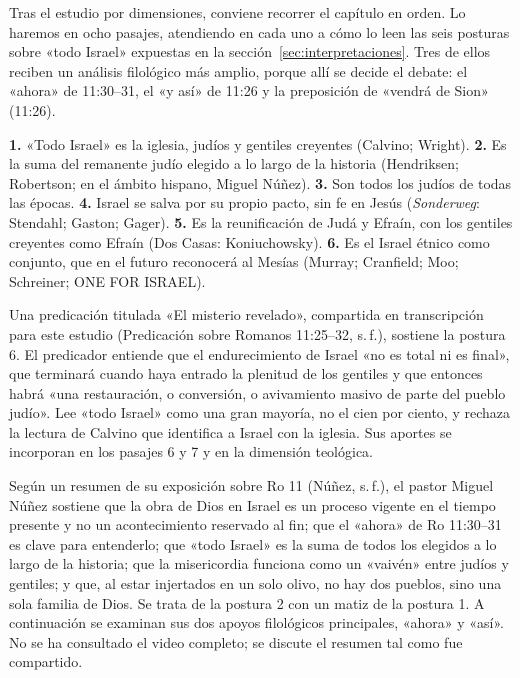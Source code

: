 Tras el estudio por dimensiones, conviene recorrer el capítulo en orden. Lo haremos en ocho pasajes, atendiendo en cada uno a cómo lo leen las seis posturas sobre «todo Israel» expuestas en la sección~\ref{sec:interpretaciones}. Tres de ellos reciben un análisis filológico más amplio, porque allí se decide el debate: el «ahora» de 11:30--31, el «y así» de 11:26 y la preposición de «vendrá de Sion» (11:26).

\begin{nota}
\textbf{1.} «Todo Israel» es la iglesia, judíos y gentiles creyentes (Calvino; Wright). \textbf{2.} Es la suma del remanente judío elegido a lo largo de la historia (Hendriksen; Robertson; en el ámbito hispano, Miguel Núñez). \textbf{3.} Son todos los judíos de todas las épocas. \textbf{4.} Israel se salva por su propio pacto, sin fe en Jesús (\emph{Sonderweg}: Stendahl; Gaston; Gager). \textbf{5.} Es la reunificación de Judá y Efraín, con los gentiles creyentes como Efraín (Dos Casas: Koniuchowsky). \textbf{6.} Es el Israel étnico como conjunto, que en el futuro reconocerá al Mesías (Murray; Cranfield; Moo; Schreiner; ONE FOR ISRAEL).
\end{nota}

\begin{nota}
Una predicación titulada «El misterio revelado», compartida en transcripción para este estudio (Predicación sobre Romanos 11:25--32, s.\,f.), sostiene la postura 6. El predicador entiende que el endurecimiento de Israel «no es total ni es final», que terminará cuando haya entrado la plenitud de los gentiles y que entonces habrá «una restauración, o conversión, o avivamiento masivo de parte del pueblo judío». Lee «todo Israel» como una gran mayoría, no el cien por ciento, y rechaza la lectura de Calvino que identifica a Israel con la iglesia. Sus aportes se incorporan en los pasajes 6 y 7 y en la dimensión teológica.
\end{nota}

\begin{nota}
Según un resumen de su exposición sobre Ro 11 (Núñez, s.\,f.), el pastor Miguel Núñez sostiene que la obra de Dios en Israel es un proceso vigente en el tiempo presente y no un acontecimiento reservado al fin; que el «ahora» de Ro 11:30--31 es clave para entenderlo; que «todo Israel» es la suma de todos los elegidos a lo largo de la historia; que la misericordia funciona como un «vaivén» entre judíos y gentiles; y que, al estar injertados en un solo olivo, no hay dos pueblos, sino una sola familia de Dios. Se trata de la postura 2 con un matiz de la postura 1. A continuación se examinan sus dos apoyos filológicos principales, «ahora» y «así». No se ha consultado el video completo; se discute el resumen tal como fue compartido.
\end{nota}

